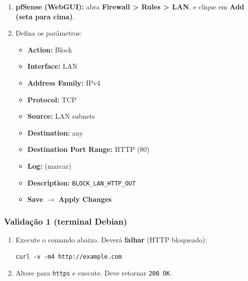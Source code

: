 \begin{enumerate}
\item \textbf{pfSense (WebGUI):} abra \textbf{Firewall > Rules > LAN}, e clique em \textbf{Add (seta para cima)}.


\item Defina os parâmetros:
\begin{itemize}
  \item \textbf{Action:} Block
  \item \textbf{Interface:} LAN
  \item \textbf{Address Family:} IPv4
  \item \textbf{Protocol:} TCP
  \item \textbf{Source:} LAN subnets
  \item \textbf{Destination:} any
  \item \textbf{Destination Port Range:} HTTP (80)
  \item \textbf{Log:} (marcar)
  \item \textbf{Description:} \texttt{BLOCK\_LAN\_HTTP\_OUT}
  \item \textbf{Save} $\rightarrow$ \textbf{Apply Changes}
\end{itemize}


\end{enumerate}

\subsubsection*{Validação 1 (terminal Debian)}

\begin{enumerate}
\item Execute o comando abaixo. Deverá \textbf{falhar} (HTTP bloqueado):
\begin{lstlisting}
curl -v -m4 http://example.com
\end{lstlisting}


\item Altere para \texttt{https} e execute. Deve retornar \texttt{200 OK}.

\end{enumerate}

